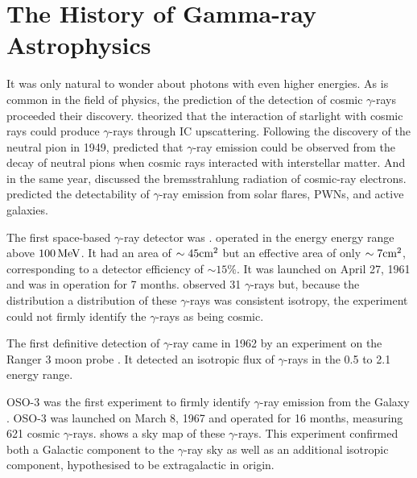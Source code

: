 \section{The History of Gamma-ray Astrophysics}

It was only natural to wonder about photons with even
higher energies. 
As is common in the field of physics, the prediction of
the detection of cosmic $\gamma$-rays proceeded their discovery.
\cite{feenberg_1948_interaction-cosmic-ray} theorized that the interaction
of starlight with cosmic rays could produce $\gamma$-rays through
\ac{IC} upscattering.  Following the discovery of the neutral
pion in 1949, \cite{hayakawa_1952_propagation-cosmic}
predicted that $\gamma$-ray emission could be observed from the
decay of neutral pions when cosmic rays interacted with interstellar
matter.  And in the same year, \cite{hutchinson_1952_possible-relation}
discussed the bremsstrahlung radiation of cosmic-ray electrons.
\cite{morrison_1958_gamma-ray-astronomy} predicted the detectability
of $\gamma$-ray emission from solar flares, \acp{PWN}, and active galaxies.

The first space-based $\gamma$-ray detector was \explorerxi
\citep{kraushaar_1965_explorer-experiment}.  \explorerxi operated in
the energy energy range above $100\,\text{MeV}$.  It had an area of
$\sim45\text{cm}^2$ but an effective area of only $\sim 7\text{cm}^2$, corresponding
to a detector efficiency of $\sim 15\%$.  It was launched on April
27, 1961 and was in operation for 7 months.  \explorerxi observed 31
$\gamma$-rays but, because the distribution a distribution of these
$\gamma$-rays was consistent isotropy, the experiment could not firmly
identify the $\gamma$-rays as being cosmic.

The first definitive detection of $\gamma$-ray came in
1962 by an experiment on the Ranger 3 moon
probe \citep{arnold_1962_gamma-space}.  It detected an isotropic flux
of $\gamma$-rays in the 0.5 \mev to 2.1 \mev energy range.

\Ac{OSO-3} was the first experiment to firmly identify
$\gamma$-ray emission from the Galaxy
\citep{kraushaar_1972_high-energy-cosmic}.  
\Ac{OSO-3} was launched on March 8, 1967 and operated for 16 months, measuring
621 cosmic $\gamma$-rays.  
 shows a sky map of these $\gamma$-rays.  This
experiment confirmed both a Galactic component to the $\gamma$-ray
sky as well as an additional isotropic component, hypothesised to be
extragalactic in origin.

